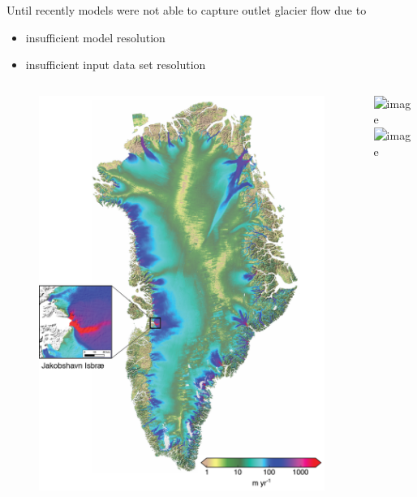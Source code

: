 \documentclass[hide notes,intlimits]{beamer}
\begin{document}
\begin{frame}
  \begin{block}{Until recently models were not able to capture outlet glacier flow due to}
    \begin{itemize}
    \item insufficient model resolution
    \item insufficient input data set resolution
    \end{itemize}
  \end{block}
  \begin{columns}
    \column[c]{3.5cm}
    \begin{figure}
      \includegraphics[width=\textwidth]{greenland-obs-overview}
    \end{figure}
    \column[c]{4cm}
    \includegraphics<1>[width=\textwidth]{jakobshavn-obs-nogate}
    \includegraphics<2>[width=\textwidth]{jakobshavn-speed-exp-4500m-ba01}
  \end{columns}

\end{frame}
\end{document}
